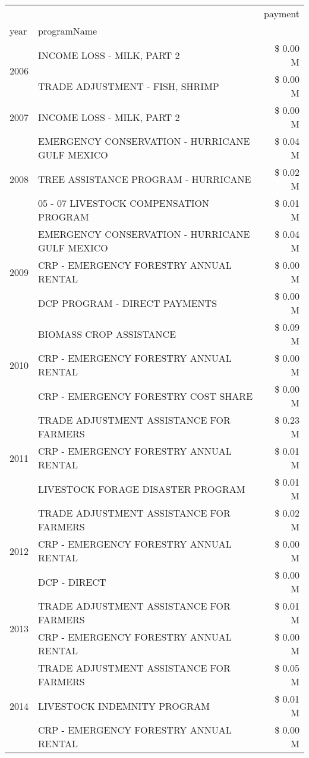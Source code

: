 \begin{tabular}{llr}
\toprule
 &  & payment \\
year & programName &  \\
\midrule
\multirow[t]{2}{*}{2006} & INCOME LOSS - MILK, PART 2 & \$ 0.00 M \\
 & TRADE ADJUSTMENT - FISH, SHRIMP & \$ 0.00 M \\
\cline{1-3}
2007 & INCOME LOSS - MILK, PART 2 & \$ 0.00 M \\
\cline{1-3}
\multirow[t]{3}{*}{2008} & EMERGENCY CONSERVATION - HURRICANE GULF MEXICO & \$ 0.04 M \\
 & TREE ASSISTANCE PROGRAM - HURRICANE & \$ 0.02 M \\
 & 05 - 07 LIVESTOCK COMPENSATION PROGRAM & \$ 0.01 M \\
\cline{1-3}
\multirow[t]{3}{*}{2009} & EMERGENCY CONSERVATION - HURRICANE GULF MEXICO & \$ 0.04 M \\
 & CRP - EMERGENCY FORESTRY ANNUAL RENTAL & \$ 0.00 M \\
 & DCP PROGRAM - DIRECT PAYMENTS & \$ 0.00 M \\
\cline{1-3}
\multirow[t]{3}{*}{2010} & BIOMASS CROP ASSISTANCE & \$ 0.09 M \\
 & CRP - EMERGENCY FORESTRY ANNUAL RENTAL & \$ 0.00 M \\
 & CRP - EMERGENCY FORESTRY COST SHARE & \$ 0.00 M \\
\cline{1-3}
\multirow[t]{3}{*}{2011} & TRADE ADJUSTMENT ASSISTANCE FOR FARMERS & \$ 0.23 M \\
 & CRP - EMERGENCY FORESTRY ANNUAL RENTAL & \$ 0.01 M \\
 & LIVESTOCK FORAGE DISASTER PROGRAM & \$ 0.01 M \\
\cline{1-3}
\multirow[t]{3}{*}{2012} & TRADE ADJUSTMENT ASSISTANCE FOR FARMERS & \$ 0.02 M \\
 & CRP - EMERGENCY FORESTRY ANNUAL RENTAL & \$ 0.00 M \\
 & DCP - DIRECT & \$ 0.00 M \\
\cline{1-3}
\multirow[t]{2}{*}{2013} & TRADE ADJUSTMENT ASSISTANCE FOR FARMERS & \$ 0.01 M \\
 & CRP - EMERGENCY FORESTRY ANNUAL RENTAL & \$ 0.00 M \\
\cline{1-3}
\multirow[t]{3}{*}{2014} & TRADE ADJUSTMENT ASSISTANCE FOR FARMERS & \$ 0.05 M \\
 & LIVESTOCK INDEMNITY PROGRAM & \$ 0.01 M \\
 & CRP - EMERGENCY FORESTRY ANNUAL RENTAL & \$ 0.00 M \\

\end{tabular}
